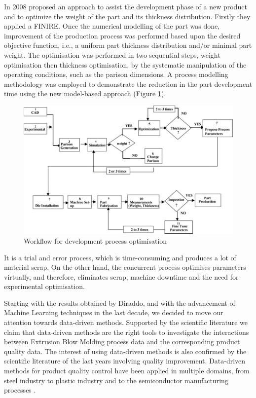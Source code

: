 In 2008 \citep{attar2008manufacturing} proposed an approach to assist the development phase of a new product and to optimize the weight of the part and its thickness distribution. Firstly they applied a FINIRE.
Once the numerical modelling of the part was done, improvement of the production process was performed based upon the desired objective function, i.e., a uniform part thickness distribution and/or minimal part weight. The optimisation was performed in two sequential steps, weight optimisation then thickness optimisation, by the systematic manipulation of the operating conditions, such as the parison dimensions. A process modelling methodology was employed to demonstrate the reduction in the part development time using the new model-based approach (Figure \ref{fig:workflow_development_process_optimisation}).
\begin{figure}
\centerline{\includegraphics[scale=0.6]{images/chapter_2/optimisation_flow.png}}
\caption{Workflow for development process optimisation \citep{attar2008manufacturing}}
\label{fig:workflow_development_process_optimisation}
\end{figure}
It is a trial and error process, which is time-consuming and produces a lot of material scrap. On the other hand, the concurrent process optimises parameters virtually, and therefore, eliminates scrap, machine downtime and the need for
experimental optimisation.

Starting with the results obtained by Diraddo, and with the advancement of Machine Learning techniques in the last decade, we decided to move our attention towards data-driven methods. Supported by the scientific literature we claim that data-driven methods are the right tools to investigate the interactions between Extrusion Blow Molding process data and the corresponding product quality data. The interest of using data-driven methods is also confirmed by the scientific literature of the last years involving quality improvement. Data-driven methods for product quality control have been applied in multiple domains, from steel industry \citep{lieber2013quality,li2018ensemble} to plastic industry \citep{chen2008neural,nagorny2017quality,haeussler1996quality,tellaeche2013machine,sharma2017taguchi} and to the semiconductor manufacturing processes \citep{melhem2016regression,lenz2013data,jiang2020novel}. 


